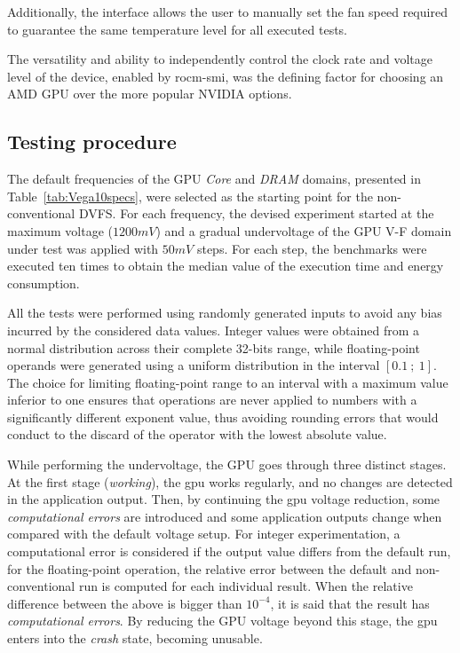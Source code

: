 Additionally, the interface allows the user to manually set the fan speed required to guarantee the same temperature level for all executed tests.

The versatility and ability to independently control the clock rate and voltage level of the device, enabled by rocm-smi, was the defining factor for choosing an AMD GPU over the more popular NVIDIA options.


\subsection{Testing procedure}
\label{sec:ex_setup}

The default frequencies of the GPU \textit{Core} and \textit{DRAM} domains, presented in Table~\ref{tab:Vega10specs}, were selected as the starting point for the non-conventional DVFS. For each frequency, the devised experiment started at the maximum voltage ($1200mV$) and a gradual undervoltage of the GPU V-F domain under test was applied with $50mV$ steps. For each step, the benchmarks were executed ten times to obtain the median value of the execution time and energy consumption. 

All the tests were performed using randomly generated inputs to avoid any bias incurred by the considered data values. Integer values were obtained from a normal distribution across their complete 32-bits range, while floating-point operands were generated using a uniform distribution in the interval $[0.1~;~1]$. The choice for limiting floating-point range to an interval with a maximum value inferior to one ensures that operations are never applied to numbers with a significantly different exponent value, thus avoiding rounding errors that would conduct to the discard of the operator with the lowest absolute value.

While performing the undervoltage, the GPU goes through three distinct stages. At the first stage (\textit{working}), the \ac{gpu} works regularly, and no changes are detected in the application output. Then, by continuing the \ac{gpu} voltage reduction, some \textit{computational errors} are introduced and some application outputs change when compared with the default voltage setup. For integer experimentation, a computational error is considered if the output value differs from the default run, for the floating-point operation, the relative error between the default and non-conventional run is computed for each individual result. When the relative difference between the above is bigger than $10^{-4}$, it is said that the result has \textit{computational errors}.
By reducing the GPU voltage beyond this stage, the \ac{gpu} enters into the \textit{crash} state, becoming unusable.

